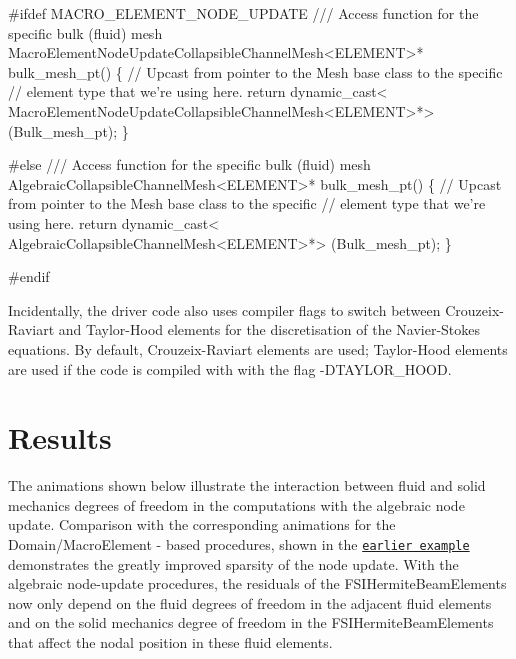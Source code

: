  
\begin{DoxyCodeInclude}
\textcolor{preprocessor}{#ifdef MACRO\_ELEMENT\_NODE\_UPDATE}
\textcolor{comment}{}
\textcolor{comment}{ /// Access function for the specific bulk (fluid) mesh}
\textcolor{comment}{} MacroElementNodeUpdateCollapsibleChannelMesh<ELEMENT>* bulk\_mesh\_pt() 
  \{
   \textcolor{comment}{// Upcast from pointer to the Mesh base class to the specific }
   \textcolor{comment}{// element type that we're using here.}
   \textcolor{keywordflow}{return} \textcolor{keyword}{dynamic\_cast<}
    MacroElementNodeUpdateCollapsibleChannelMesh<ELEMENT>*\textcolor{keyword}{>}
    (Bulk\_mesh\_pt);
  \}

\textcolor{preprocessor}{#else}
\textcolor{comment}{}
\textcolor{comment}{ /// Access function for the specific bulk (fluid) mesh}
\textcolor{comment}{} AlgebraicCollapsibleChannelMesh<ELEMENT>* bulk\_mesh\_pt() 
  \{
   \textcolor{comment}{// Upcast from pointer to the Mesh base class to the specific }
   \textcolor{comment}{// element type that we're using here.}
   \textcolor{keywordflow}{return} \textcolor{keyword}{dynamic\_cast<}
    AlgebraicCollapsibleChannelMesh<ELEMENT>*\textcolor{keyword}{>}
    (Bulk\_mesh\_pt);
  \}

\textcolor{preprocessor}{#endif}

\end{DoxyCodeInclude}


Incidentally, the driver code also uses compiler flags to switch between Crouzeix-\/\+Raviart and Taylor-\/\+Hood elements for the discretisation of the Navier-\/\+Stokes equations. By default, Crouzeix-\/\+Raviart elements are used; Taylor-\/\+Hood elements are used if the code is compiled with with the flag {\ttfamily -\/\+D\+T\+A\+Y\+L\+O\+R\+\_\+\+H\+O\+OD}.



 

\hypertarget{index_results}{}\section{Results}\label{index_results}
The animations shown below illustrate the interaction between fluid and solid mechanics degrees of freedom in the computations with the algebraic node update. Comparison with the corresponding animations for the {\ttfamily Domain/\+Macro\+Element} -\/ based procedures, shown in the \href{../../fsi_collapsible_channel/html/index.html#comments}{\tt earlier example} demonstrates the greatly improved sparsity of the node update. With the algebraic node-\/update procedures, the residuals of the {\ttfamily F\+S\+I\+Hermite\+Beam\+Elements} now only depend on the fluid degrees of freedom in the adjacent fluid elements and on the solid mechanics degree of freedom in the {\ttfamily F\+S\+I\+Hermite\+Beam\+Elements} that affect the nodal position in these fluid elements.

